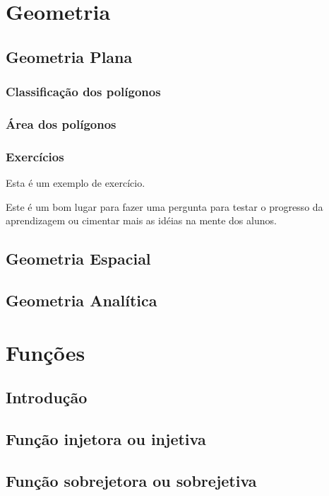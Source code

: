\documentclass[11pt,fleqn]{book} %
\begin{document}
\part{Geometria}
\chapter{Geometria Plana}
    \section{Classificação dos polígonos}
    
    \section{Área dos polígonos}
    
    \section{Exercícios}
        Esta é um exemplo de exercício.
        \begin{exercise}
        Este é um bom lugar para fazer uma pergunta para testar o progresso da aprendizagem ou cimentar mais as idéias na mente dos alunos.
        \end{exercise} 
        
\chapter{Geometria Espacial}
    
\chapter{Geometria Analítica}


\part{Funções}
\chapter{Introdução}

\chapter{Função injetora ou injetiva}

\chapter{Função sobrejetora ou sobrejetiva}
\end{document}

